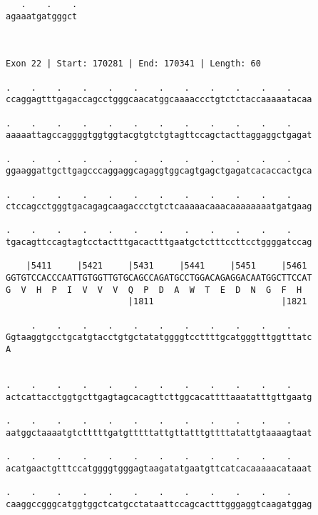\documentclass{article}
\begin{document}
\begin{Verbatim}
   .    .    .
agaaatgatgggct
              
              
 
Exon 22 | Start: 170281 | End: 170341 | Length: 60
 
.    .    .    .    .    .    .    .    .    .    .    .    
ccaggagtttgagaccagcctgggcaacatggcaaaaccctgtctctaccaaaaatacaa
                                                            
.    .    .    .    .    .    .    .    .    .    .    .    
aaaaattagccaggggtggtggtacgtgtctgtagttccagctacttaggaggctgagat
                                                            
.    .    .    .    .    .    .    .    .    .    .    .    
ggaaggattgcttgagcccaggaggcagaggtggcagtgagctgagatcacaccactgca
                                                            
.    .    .    .    .    .    .    .    .    .    .    .    
ctccagcctgggtgacagagcaagaccctgtctcaaaaacaaacaaaaaaaatgatgaag
                                                            
.    .    .    .    .    .    .    .    .    .    .    .    
tgacagttccagtagtcctactttgacactttgaatgctctttccttcctggggatccag
                                                            
    |5411     |5421     |5431     |5441     |5451     |5461 
GGTGTCCACCCAATTGTGGTTGTGCAGCCAGATGCCTGGACAGAGGACAATGGCTTCCAT
G  V  H  P  I  V  V  V  Q  P  D  A  W  T  E  D  N  G  F  H  
                        |1811                         |1821 
  
     .    .    .    .    .    .    .    .    .    .    .    
Ggtaaggtgcctgcatgtacctgtgctatatggggtccttttgcatgggtttggtttatc
A                                                           
                                                            
  
.    .    .    .    .    .    .    .    .    .    .    .    
actcattacctggtgcttgagtagcacagttcttggcacattttaaatatttgttgaatg
                                                            
.    .    .    .    .    .    .    .    .    .    .    .    
aatggctaaaatgtctttttgatgtttttattgttatttgttttatattgtaaaagtaat
                                                            
.    .    .    .    .    .    .    .    .    .    .    .    
acatgaactgtttccatggggtgggagtaagatatgaatgttcatcacaaaaacataaat
                                                            
.    .    .    .    .    .    .    .    .    .    .    .    
caaggccgggcatggtggctcatgcctataattccagcactttgggaggtcaagatggag
                                                            

\end{Verbatim}
\end{document}
